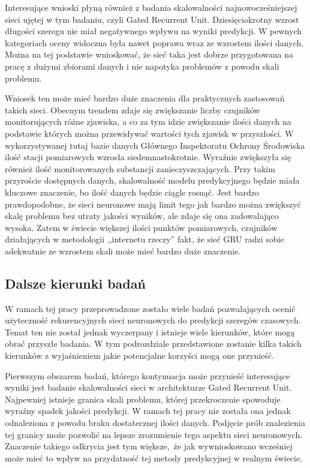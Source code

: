 \documentclass[10pt,a4paper]{article}
\begin{document}
Interesujące wnioski płyną również z badania skalowalności najnowocześniejszej sieci ujętej w tym badaniu, czyli Gated Recurrent Unit. Dziesięciokrotny wzrost długości szeregu nie miał negatywnego wpływu na wyniki predykcji. W pewnych kategoriach oceny widoczna była nawet poprawa wraz ze wzrostem ilości danych. Można na tej podstawie wnioskować, że sieć taka jest dobrze przygotowana na pracę z dużymi zbiorami danych i nie napotyka problemów z powodu skali problemu.

Wniosek ten może mieć bardzo duże znaczenia dla praktycznych zastosowań takich sieci. Obecnym trendem zdaje się zwiększanie liczby czujników monitorujących różne zjawiska, a co za tym idzie zwiększanie ilości danych na podstawie których można przewidywać wartości tych zjawisk w przyszłości. W wykorzystywanej tutaj bazie danych Głównego Inspektoratu Ochrony Środowiska ilość stacji pomiarowych wzrosła siedemnastokrotnie. Wyraźnie zwiększyła się również ilość monitorowanych substancji zanieczyszczających. Przy takim przyroście dostępnych danych, skalowalność modelu predykcyjnego będzie miała kluczowe znaczenie, bo ilość danych będzie ciągle rosnąć. Jest bardzo prawdopodobne, że sieci neuronowe mają limit tego jak bardzo można zwiększyć skalę problemu bez utraty jakości wyników, ale zdaje się ona zadowalająco wysoka. Zatem w świecie większej ilości punktów pomiarowych, czujników działających w metodologii ,,internetu rzeczy'' fakt, że sieć GRU radzi sobie adekwatnie ze wzrostem skali może mieć bardzo duże znaczenie.

\subsection{Dalsze kierunki badań}
W ramach tej pracy przeprowadzone zostało wiele badań pozwalających ocenić użyteczność rekurencyjnych sieci neuronowych do predykcji szeregów czasowych. Temat ten nie został jednak wyczerpany i istnieje wiele kierunków, które mogą obrać przyszłe badania. W tym podrozdziale przedstawione zostanie kilka takich kierunków z wyjaśnieniem jakie potencjalne korzyści mogą one przynieść. 

Pierwszym obszarem badań, którego kontynuacja może przynieść interesujące wyniki jest badanie skalowalności sieci w architekturze Gated Recurrent Unit. Najpewniej istnieje granica skali problemu, której przekroczenie spowoduje wyraźny spadek jakości predykcji. W ramach tej pracy nie została ona jednak odnaleziona z powodu braku dostatecznej ilości danych. Podjęcie prób znalezienia tej granicy może pozwolić na lepsze zrozumienie tego aspektu sieci neuronowych. Znaczenie takiego odkrycia jest tym większe, że jak wywnioskowano wcześniej może mieć to wpływ na przydatność tej metody predykcyjnej w realnym świecie. 
\end{document}
